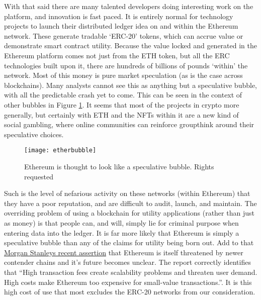 With that said there are many talented developers doing interesting work on the platform, and innovation is fast paced. It is entirely normal for technology projects to launch their distributed ledger idea on and within the Ethereum network. These generate tradable `ERC-20' tokens, which can accrue value or demonstrate smart contract utility. Because the value locked and generated in the Ethereum platform comes not just from the ETH token, but all the ERC technologies built upon it, there are hundreds of billions of pounds `within' the network. Most of this money is pure market speculation (as is the case across blockchains). Many analysts cannot see this as anything but a speculative bubble, with all the predictable crash yet to come. This can be seen in the context of other bubbles in Figure \ref{fig:etherbubble}. It seems that most of the projects in crypto more generally, but certainly with ETH and the NFTs within it are a new kind of social gambling, where online communities can reinforce groupthink around their speculative choices.

\begin{figure}
  \centering
    \texttt{[image: etherbubble]}
  \caption{Ethereum is thought to look like a speculative bubble. Rights requested}
    \label{fig:etherbubble}
\end{figure}

Such is the level of nefarious activity on these networks (within Ethereum) that they have a poor reputation, and are difficult to audit, launch, and maintain. The overriding problem of using a blockchain for utility applications (rather than just as money) is that people can, and will, simply lie for criminal purpose when entering data into the ledger. It is far more likely that Ethereum is simply a speculative bubble than any of the claims for utility being born out. Add to that \href{https://advisor.morganstanley.com/daron.edwards/documents/field/d/da/daron-edwards/Cryptocurrency_201__What_is_Ethereum_.pdf}{Morgan Stanleys recent assertion} that Ethereum is itself threatened by newer contender chains and it's future becomes unclear. The report correctly identifies that ``High transaction fees create scalability problems and threaten user demand. High costs make Ethereum too expensive for small-value transactions.''. It is this high cost of use that most excludes the ERC-20 networks from our consideration.
